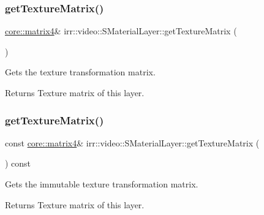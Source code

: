 \subsubsection{\texorpdfstring{get\+Texture\+Matrix()}{getTextureMatrix()}\hspace{0.1cm}{\footnotesize\ttfamily [1/2]}}
{\footnotesize\ttfamily \hyperlink{namespaceirr_1_1core_a73fa92e638c5ca97efd72da307cc9b65}{core\+::matrix4}\& irr\+::video\+::\+S\+Material\+Layer\+::get\+Texture\+Matrix (\begin{DoxyParamCaption}{ }\end{DoxyParamCaption})\hspace{0.3cm}{\ttfamily [inline]}}



Gets the texture transformation matrix. 

\begin{DoxyReturn}{Returns}
Texture matrix of this layer. 
\end{DoxyReturn}
\mbox{\label{classirr_1_1video_1_1SMaterialLayer_a81072348510d63fcc11134ae7471c5f7}} 
\subsubsection{\texorpdfstring{get\+Texture\+Matrix()}{getTextureMatrix()}\hspace{0.1cm}{\footnotesize\ttfamily [2/2]}}
{\footnotesize\ttfamily const \hyperlink{namespaceirr_1_1core_a73fa92e638c5ca97efd72da307cc9b65}{core\+::matrix4}\& irr\+::video\+::\+S\+Material\+Layer\+::get\+Texture\+Matrix (\begin{DoxyParamCaption}{ }\end{DoxyParamCaption}) const\hspace{0.3cm}{\ttfamily [inline]}}



Gets the immutable texture transformation matrix. 

\begin{DoxyReturn}{Returns}
Texture matrix of this layer. 
\end{DoxyReturn}
\mbox{\label{classirr_1_1video_1_1SMaterialLayer_a2d379f02b6a06600df2b0eaf252c8f71}} 
